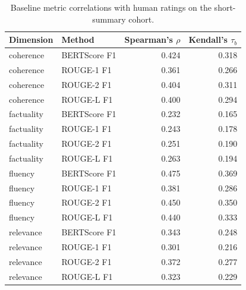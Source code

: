 \begin{table}[htbp]
\centering
\caption{Baseline metric correlations with human ratings on the short-summary cohort.}
\label{tab:baseline_metric_validity}
\begin{tabular}{llrr}
\toprule
Dimension & Method & Spearman's $\rho$ & Kendall's $\tau_b$ \\
\midrule
coherence & BERTScore F1 & 0.424 & 0.318 \\
coherence & ROUGE-1 F1 & 0.361 & 0.266 \\
coherence & ROUGE-2 F1 & 0.404 & 0.311 \\
coherence & ROUGE-L F1 & 0.400 & 0.294 \\
factuality & BERTScore F1 & 0.232 & 0.165 \\
factuality & ROUGE-1 F1 & 0.243 & 0.178 \\
factuality & ROUGE-2 F1 & 0.251 & 0.190 \\
factuality & ROUGE-L F1 & 0.263 & 0.194 \\
fluency & BERTScore F1 & 0.475 & 0.369 \\
fluency & ROUGE-1 F1 & 0.381 & 0.286 \\
fluency & ROUGE-2 F1 & 0.450 & 0.350 \\
fluency & ROUGE-L F1 & 0.440 & 0.333 \\
relevance & BERTScore F1 & 0.343 & 0.248 \\
relevance & ROUGE-1 F1 & 0.301 & 0.216 \\
relevance & ROUGE-2 F1 & 0.372 & 0.277 \\
relevance & ROUGE-L F1 & 0.323 & 0.229 \\
\bottomrule
\end{tabular}
\end{table}
